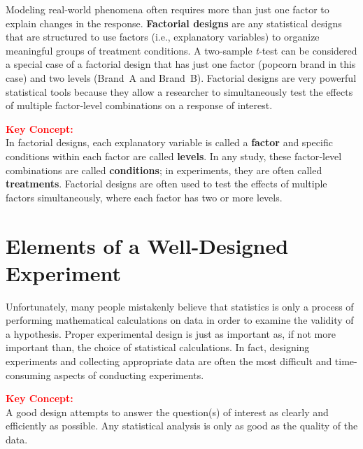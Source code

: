 \documentclass[
]{report}
\begin{document}
Modeling real‑world phenomena often requires more than just one factor to explain changes in the response. \textbf{Factorial designs} are any statistical designs that are structured to use factors (i.e., explanatory variables) to organize meaningful groups of treatment conditions. A two‑sample \emph{t}‑test can be considered a special case of a factorial design that has just one factor (popcorn brand in this case) and two levels (Brand~A and Brand~B). Factorial designs are very powerful statistical tools because they allow a researcher to simultaneously test the effects of multiple factor‑level combinations on a response of interest.

\large

\textbf{\textcolor{red}{Key Concept:}}\\
\color{red}
In factorial designs, each explanatory variable is called a \textbf{factor} and specific conditions within each factor are called \textbf{levels}. In any study, these factor‑level combinations are called \textbf{conditions}; in experiments, they are often called \textbf{treatments}. Factorial designs are often used to test the effects of multiple factors simultaneously, where each factor has two or more levels.\\
\color{black}
\normalsize

\hypertarget{elements-of-a-well-designed-experiment}{%
\section{\texorpdfstring{\textbf{Elements of a Well-Designed Experiment}}{Elements of a Well-Designed Experiment}}\label{elements-of-a-well-designed-experiment}}

Unfortunately, many people mistakenly believe that statistics is only a process of performing mathematical calculations on data in order to examine the validity of a hypothesis. Proper experimental design is just as important as, if not more important than, the choice of statistical calculations. In fact, designing experiments and collecting appropriate data are often the most difficult and time-consuming aspects of conducting experiments.

\large

\textbf{\textcolor{red}{Key Concept:}}\\
\color{red}
A good design attempts to answer the question(s) of interest as clearly and efficiently as possible. Any statistical analysis is only as good as the quality of the data.\\
\color{black}
\normalsize
\end{document}
